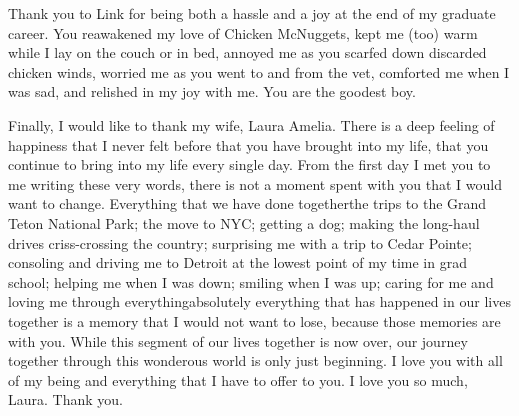\begin{acknowledge}
Thank you to Link for being both a hassle and a joy at the end of my
graduate career. You reawakened my love of Chicken McNuggets, kept me
(too) warm while I lay on the couch or in bed, annoyed me as you scarfed
down discarded chicken winds, worried me as you went to and from the
vet, comforted me when I was sad, and relished in my joy with me. You
are the goodest boy.

Finally, I would like to thank my wife, Laura Amelia. There is a deep
feeling of happiness that I never felt before that you have brought into
my life, that you continue to bring into my life every single day. From
the first day I met you to me writing these very words, there is not a
moment spent with you that I would want to change. Everything that we
have done together\textemdash{}the trips to the Grand Teton National
Park; the move to NYC; getting a dog; making the long-haul drives
criss-crossing the country; surprising me with a trip to Cedar Pointe;
consoling and driving me to Detroit at the lowest point of my time in
grad school; helping me when I was down; smiling when I was up; caring
for me and loving me through everything\textemdash{}absolutely
everything that has happened in our lives together is a memory that I
would not want to lose, because those memories are with you. While this
segment of our lives together is now over, our journey together through
this wonderous world is only just beginning. I love you with all of my
being and everything that I have to offer to you. I love you so much,
Laura. Thank you.

\end{acknowledge}
